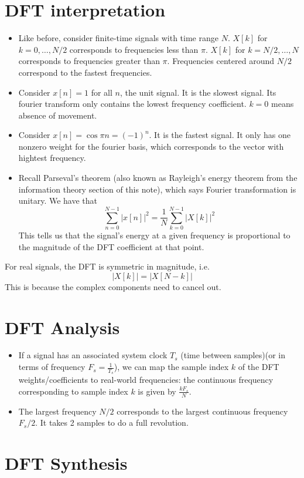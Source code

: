 \documentclass[../main.tex]{subfiles}
\begin{document}
\section{DFT interpretation}
\begin{itemize}
    \item Like before, consider finite-time signals with time range $N$. $X[k]$ for $k=0,\dots,N/2$ corresponds to frequencies less than $\pi$. $X[k]$ for $k=N/2,\dots,N$ corresponds to frequencies greater than $\pi$. Frequencies centered around $N/2$ correspond to the fastest frequencies. 
    \item Consider $x[n]=1$ for all $n$, the unit signal. It is the slowest signal. Its fourier transform only contains the lowest frequency coefficient. $k=0$ means absence of movement.
    \item Consider $x[n]=\cos \pi n = (-1)^n$. It is the fastest signal. It only has one nonzero weight for the fourier basis, which corresponds to the vector with hightest frequency.
    \item Recall Parseval's theorem (also known as Rayleigh's energy theorem from the information theory section of this note), which says Fourier transformation is unitary. We have that \[
    \sum_{n=0}^{N-1}|x[n]|^2=\frac{1}{N}\sum_{k=0}^{N-1}|X[k]|^2
    \]
    This tells us that the signal's energy at a given frequency is proportional to the magnitude of the DFT coefficient at that point.
\end{itemize}
\begin{remark}
    For real signals, the DFT is symmetric in magnitude, i.e. \[
    |X[k]|=|X[N-k]|
    \]
    This is because the complex components need to cancel out.
\end{remark}
\section{DFT Analysis}
\begin{itemize}
    \item If a signal has an associated system clock $T_s$ (time between samples)(or in terms of frequency $F_s=\frac{1}{T_s}$), we can map the sample index $k$ of the DFT weights/coefficients to real-world frequencies: the continuous frequency corresponding to sample index $k$ is given by $\frac{k F_s}{N}$.
    \item The largest frequency $N/2$ corresponds to the largest continuous frequency $F_s/2$. It takes 2 samples to do a full revolution.
\end{itemize}

\section{DFT Synthesis}
\end{document}
